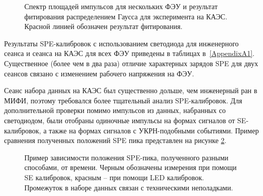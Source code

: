 \begin{figure}[H]
	\caption[Спектр площадей импульсов для ФЭУ В07(из нижней матрицы) и результат его фитирования распределением Гаусса для эксперимента на КАЭС.]{Спектр площадей импульсов для нескольких ФЭУ и результат фитирования распределением Гаусса для эксперимента на КАЭС. Красной линией обозначен результат фитирования.}
	\label{img:spe2022}
\end{figure}

Результаты SPE-калибровок с использованием светодиода для инженерного сеанса и сеанса на КАЭС для всех ФЭУ приведены в таблицах в~\ref{AppendixA1}. Существенное (более чем в два раза) отличие характерных зарядов SPE для двух сеансов связано с изменением рабочего напряжения на ФЭУ. 

Сеанс набора данных на КАЭС был существенно дольше, чем инженерный ран в МИФИ, поэтому требовался более тщательный анализ SPE-калибровок. Для дополнительной проверки помимо импульсов из данных, набранных со светодиодом, были отобраны одиночные импульсы на формах сигналов от SE-калибровок, а также на формах сигналов с УКРН-подобными событиями. Пример сравнения полученных положений SPE пика представлен на рисунке \ref{img:spevstime2022}. 

\begin{figure}[H]
	\caption[Пример зависимости положения SPE-пика, полученного разными способами, от времени.] {Пример зависимости положения SPE-пика, полученного разными способами, от времени. Черным обозначены измерения при помощи SE калибровок, красным -- при помощи LED калибровок. Промежуток в наборе данных связан с техническими неполадками.}
	\label{img:spevstime2022}
\end{figure}

